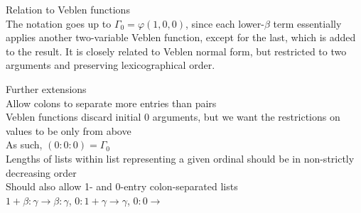 \documentclass{article}
\begin{document}
Relation to Veblen functions \\
The notation goes up to $\Gamma_0=\varphi(1, 0, 0)$,
since each lower-$\beta$ term essentially applies
another two-variable Veblen function,
except for the last, which is added to the result.
It is closely related to Veblen normal form,
but restricted to two arguments
and preserving lexicographical order.

Further extensions \\
Allow colons to separate more entries than pairs \\
Veblen functions discard initial 0 arguments,
but we want the restrictions on values to be only from above \\
As such, $(0:0:0) = \Gamma_0$ \\
Lengths of lists within list representing a given ordinal
should be in non-strictly decreasing order \\
Should also allow 1- and 0-entry colon-separated lists \\
$1+\beta : \gamma \rightarrow \beta : \gamma$,
$0 : 1+\gamma \rightarrow \gamma$,
$0 : 0 \rightarrow$


\end{document}
